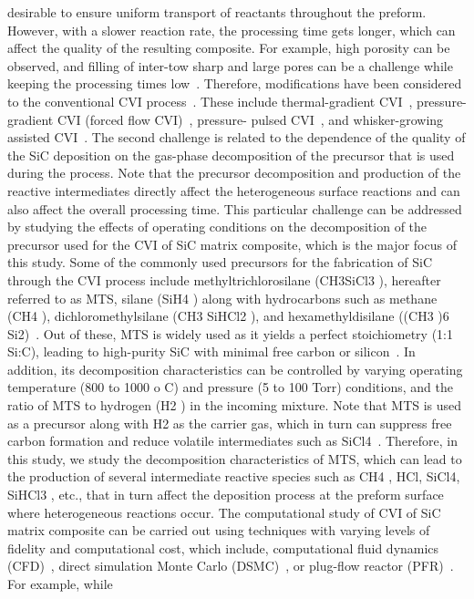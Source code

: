 \documentclass[final, letterpaper, square, comma, numbers, sort&compress]{elsarticle}
\begin{document}
desirable to ensure uniform transport of reactants throughout the preform. However, with a slower reaction
rate, the processing time gets longer, which can affect the quality of the resulting composite. For example,
high porosity can be observed, and filling of inter-tow sharp and large pores can be a challenge while keeping
the processing times low~\cite{Liu2021}. Therefore, modifications have been considered to the conventional CVI process~\cite{Lamon2005,Probst1999}. These include thermal-gradient CVI~\cite{Stinton1986}, pressure-gradient CVI (forced flow CVI)~\cite{Deck2013}, pressure-
pulsed CVI~\cite{Naslain2001}, and whisker-growing assisted CVI~\cite{Oh2001}. The second challenge is related to the dependence
of the quality of the SiC deposition on the gas-phase decomposition of the precursor that is used during the
process. Note that the precursor decomposition and production of the reactive intermediates directly affect
the heterogeneous surface reactions and can also affect the overall processing time. This particular challenge
can be addressed by studying the effects of operating conditions on the decomposition of the precursor used
for the CVI of SiC matrix composite, which is the major focus of this study.
Some of the commonly used precursors for the fabrication of SiC through the CVI process include
methyltrichlorosilane (CH3SiCl3 ), hereafter referred to as MTS, silane (SiH4 ) along with hydrocarbons such
as methane (CH4 ), dichloromethylsilane (CH3 SiHCl2 ), and hexamethyldisilane ((CH3 )6 Si2)~\cite{Noda1992,Naslain2006,Lazzeri2012}. Out
of these, MTS is widely used as it yields a perfect stoichiometry (1:1 Si:C), leading to high-purity SiC
with minimal free carbon or silicon~\cite{Lamon2005}. In addition, its decomposition characteristics can be controlled by
varying operating temperature (800 to 1000 o C) and pressure (5 to 100 Torr) conditions, and the ratio of
MTS to hydrogen (H2 ) in the incoming mixture. Note that MTS is used as a precursor along with H2 as
the carrier gas, which in turn can suppress free carbon formation and reduce volatile intermediates such as
SiCl4~\cite{Lazzeri2012}. Therefore, in this study, we study the decomposition characteristics of MTS, which can lead to
the production of several intermediate reactive species such as CH4 , HCl, SiCl4, SiHCl3 , etc., that in turn
affect the deposition process at the preform surface where heterogeneous reactions occur.
The computational study of CVI of SiC matrix composite can be carried out using techniques with
varying levels of fidelity and computational cost, which include, computational fluid dynamics (CFD)~\cite{Streitwieser2006,Ramadan2018,Cha2022,Ramanuj2022}, direct simulation Monte Carlo (DSMC)~\cite{Deck2013,Deck2012}, or plug-flow reactor (PFR)~\cite{Dang2022}. For example, while
\end{document}
